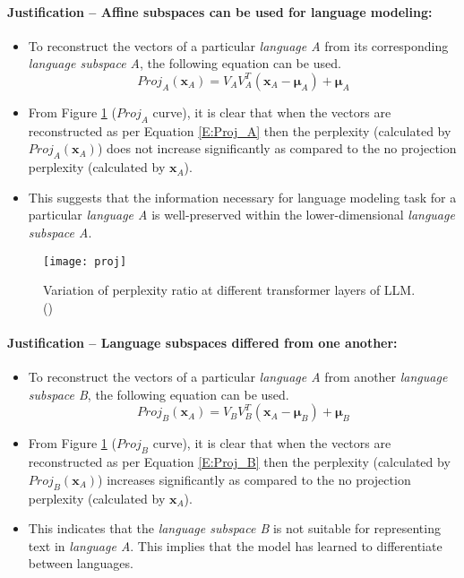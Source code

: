 \paragraph{Justification -- Affine subspaces can be used for language modeling:}
\begin{itemize}
	\item To reconstruct the vectors of a particular \emph{language A} from its corresponding \emph{language subspace A}, the following equation can be used.
	\begin{equation}\label{E:Proj_A}
		Proj_A(\mathbf{x}_A) = V_A V_A^T (\mathbf{x}_A - \bm{\mu}_A) + \bm{\mu}_A 
	\end{equation}
	
	\item From Figure \ref{F:proj} ($Proj_A$ curve), it is clear that when the vectors are reconstructed as per Equation \ref{E:Proj_A} then the perplexity (calculated by $Proj_A(\mathbf{x}_A)$) does not increase significantly as compared to the no projection perplexity (calculated by $\mathbf{x}_A$).
	
	\item This suggests that the information necessary for language modeling task for a particular \emph{language A} is well-preserved within the lower-dimensional \emph{language subspace A}.
	
\end{itemize}

\begin{figure}[tbh]
	\centering
	\texttt{[image: proj]}
	\caption[Variation of perplexity ratio at different transformer layers of LLM]{Variation of perplexity ratio at different transformer layers of LLM. (\citet{chang2022geometry})}
	\label{F:proj}
\end{figure}

\paragraph{Justification -- Language subspaces differed from one another:}
\begin{itemize}
	\item To reconstruct the vectors of a particular \emph{language A} from another \emph{language subspace B}, the following equation can be used.
	\begin{equation}\label{E:Proj_B}
		Proj_B(\mathbf{x}_A) = V_B V_B^T (\mathbf{x}_A - \bm{\mu}_B) + \bm{\mu}_B
	\end{equation}
	
	\item From Figure \ref{F:proj} ($Proj_B$ curve), it is clear that when the vectors are reconstructed as per Equation \ref{E:Proj_B} then the perplexity (calculated by $Proj_B(\mathbf{x}_A)$) increases significantly as compared to the no projection perplexity (calculated by $\mathbf{x}_A$).
	
	\item This indicates that the \emph{language subspace B} is not suitable for representing text in \emph{language A}. This implies that the model has learned to differentiate between languages.
\end{itemize}

